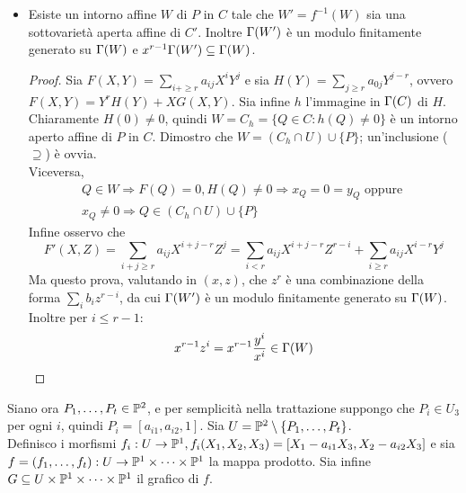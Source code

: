 \begin{itemize}
\begin{proof}
\begin{equation*}
            \end{equation*}
            Inoltre $m_{P_i}(C) \leq I(P_i, F' \cap X) = I(P_i, \prod_{i=1}^r(Z-\alpha_i) \cap X) = r_i$. La parte di enunciato riguardo l'ordine in $P_i$ della funzione $x$ è ovvia.
        \end{proof}
        \item Esiste un intorno affine $W$ di $P$ in $C$ tale che $W' = f^{-1}(W)$ sia una sottovarietà aperta affine di $C'$. Inoltre $\gG(W')$ è un modulo finitamente generato su $\gG(W)$ e $x^{r-1}\gG(W') \subseteq \gG(W)$.
        \begin{proof}
            Sia $F(X,Y) = \sum_{i+ \geq r} a_{ij}X^iY^j$ e sia $H(Y) = \sum_{j \geq r} a_{0j}Y^{j-r}$, ovvero $F(X,Y) = Y^rH(Y) + XG(X,Y)$. Sia infine $h$ l'immagine in $\gG(C)$ di $H$.\\
            Chiaramente $H(0) \neq 0$, quindi $W = C_h = \{Q \in C : h(Q) \neq 0\}$ è un intorno aperto affine di $P$ in $C$. Dimostro che $W = (C_h \cap U) \cup \{P\}$; un'inclusione ($\supseteq$) è ovvia. \\
            Viceversa, \begin{multline*}
                Q \in W \Longrightarrow F(Q) = 0, H(Q) \neq 0 \Longrightarrow x_Q = 0 = y_Q \text{ oppure } \\ x_Q \neq 0 \Longrightarrow Q \in (C_h \cap U) \cup \{P\}
            \end{multline*}
            Infine osservo che \begin{equation*}
                F'(X,Z) = \sum_{i + j \geq r} a_{ij}X^{i+j-r} Z^j = \sum_{i < r} a_{ij}X^{i+j-r}Z^{r-i} + \sum_{i \geq r}a_{ij}X^{i-r}Y^j
            \end{equation*}
            Ma questo prova, valutando in $(x,z)$, che $z^r$ è una combinazione della forma $\sum_{i} b_iz^{r-i}$, da cui  $\gG(W')$ è un modulo finitamente generato su $\gG(W)$. Inoltre per $i \leq r-1$: \begin{equation*}
                x^{r-1}z^i = x^{r-1}\frac{y^i}{x^i} \in \gG(W)
            \end{equation*}
        \end{proof}
    \end{itemize}
    Siano ora $P_1,\ldots,P_t \in \P^2$, e per semplicità nella trattazione suppongo che $P_i \in U_3$ per ogni $i$, quindi $P_i = [a_{i1},a_{i2},1]$. Sia $U = \P^2 \setminus \{P_1,\ldots,P_t\}$. \\
    Definisco i morfismi $f_i : U \to \P^1, f_i(X_1,X_2,X_3) = [X_1 -a_{i1}X_3, X_2 - a_{i2}X_3]$ e sia $f = (f_1,\ldots,f_t) : U \to \P^1 \times \cdots \times \P^1$ la mappa prodotto. Sia infine $G \subseteq U \times \P^1 \times \cdots \times \P^1$ il grafico di $f$.\\
